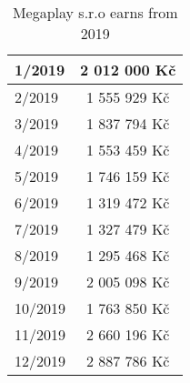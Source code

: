 \begin{table}[h!]
    \begin{center}
        \begin{tabular}{ | l | c | }
            \hline
            1/2019 & 2 012 000 Kč \\
            \hline
            2/2019 & 1 555 929 Kč \\
            \hline
            3/2019 & 1 837 794 Kč \\
            \hline
            4/2019 & 1 553 459 Kč \\
            \hline
            5/2019 & 1 746 159 Kč \\
            \hline
            6/2019 & 1 319 472 Kč \\
            \hline
            7/2019 & 1 327 479 Kč \\
            \hline
            8/2019 & 1 295 468 Kč \\
            \hline
            9/2019 & 2 005 098 Kč \\
            \hline
            10/2019 & 1 763 850 Kč \\
            \hline
            11/2019 & 2 660 196 Kč \\
            \hline
            12/2019 & 2 887 786 Kč \\
            \hline
        \end{tabular}
    \end{center}
    \caption{Megaplay s.r.o earns from 2019}
    \label{Megaplay s.r.o earns from 2019}
\end{table}
